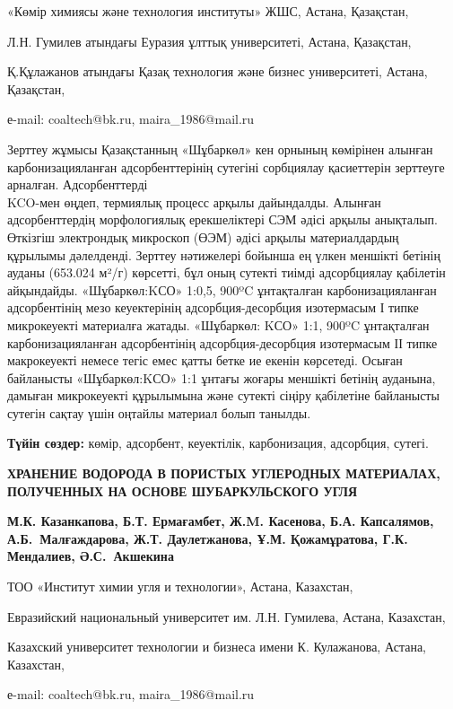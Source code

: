 \begin{affil}
«Көмір химиясы және технология институты» ЖШС, Астана, Қазақстан,

Л.Н. Гумилев атындағы Еуразия ұлттық университеті, Астана, Қазақстан,

Қ.Құлажанов атындағы Қазақ технология және бизнес университеті, Астана, Қазақстан,

е-mail: coaltech@bk.ru, maira\_1986@mail.ru
\end{affil}

Зерттеу жұмысы Қазақстанның «Шұбаркөл» кен орнының көмірінен алынған
карбонизацияланған адсорбенттерінің сутегіні сорбциялау қасиеттерін
зерттеуге арналған. Адсорбенттерді\\
KCO-мен өңдеп, термиялық процесс
арқылы дайындалды. Алынған адсорбенттердің морфологиялық ерекшеліктері
СЭМ әдісі арқылы анықталып. Өткізгіш электрондық микроскоп (ӨЭМ) әдісі
арқылы материалдардың құрылымы дәлелденді. Зерттеу нәтижелері бойынша ең
үлкен меншікті бетінің ауданы (653.024 м²/г) көрсетті, бұл оның сутекті
тиімді адсорбциялау қабілетін айқындайды.
«Шұбаркөл:KСО» 1:0,5, 900ºC
ұнтақталған карбонизацияланған адсорбентінің мезо кеуектерінің
адсорбция-десорбция изотермасым І типке микрокеуекті материалға жатады.
«Шұбаркөл: KСО» 1:1, 900ºC ұнтақталған
карбонизацияланған адсорбентінің адсорбция-десорбция изотермасым ІІ
типке макрокеуекті немесе тегіс емес қатты бетке ие екенін көрсетеді.
Осыған байланысты «Шұбаркөл:KСО» 1:1
ұнтағы жоғары меншікті бетінің ауданына, дамыған микрокеуекті құрылымына
және сутекті сіңіру қабілетіне байланысты сутегін сақтау үшін оңтайлы
материал болып танылды.

{\bfseries Түйін сөздер:} көмір, адсорбент, кеуектілік, карбонизация,
адсорбция, сутегі.

\begin{header}
{\bfseries ХРАНЕНИЕ ВОДОРОДА В ПОРИСТЫХ УГЛЕРОДНЫХ МАТЕРИАЛАХ, ПОЛУЧЕННЫХ НА ОСНОВЕ ШУБАРКУЛЬСКОГО УГЛЯ} 

{\bfseries
{}М.К. Казанкапова,
Б.Т. Ермағамбет,
Ж.M. Касенова,
Б.А. Капсалямов, 
А.Б.~Малғаждарова,
Ж.Т. Даулетжанова,
Ұ.М. Қожамұратова, 
Г.К. Мендалиев,
Ә.С.~Акшекина
}
\end{header}

\begin{affil}
ТОО «Институт химии угля и технологии», Астана, Казахстан,

Евразийский национальный университет им. Л.Н. Гумилева, Астана, Казахстан,

Казахский университет технологии и бизнеса имени К. Кулажанова, Астана, Казахстан,

е-mail: coaltech@bk.ru, maira\_1986@mail.ru
\end{affil}

